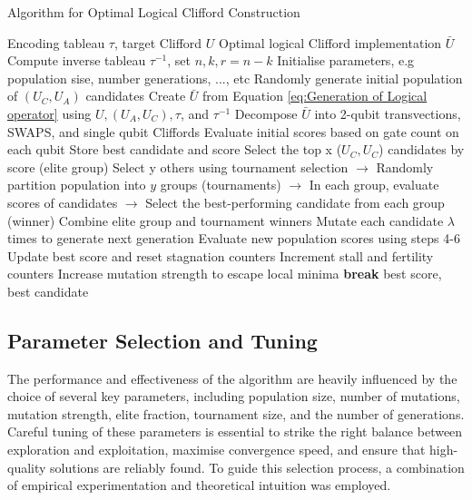 \begin{algorithm}[H]
\caption{Algorithm for Optimal Logical Clifford Construction}
\label{alg:logical_clifford_construction}
\begin{algorithmic}[1]
\Require Encoding tableau \(\tau\), target Clifford \(U\)
\Ensure Optimal logical Clifford implementation \(\bar{U}\)
\State Compute inverse tableau \(\tau^{-1}\), set \(n, k, r = n-k\)
\State Initialise parameters, e.g population sise, number generations, ..., etc
\Statex
\State Randomly generate initial population of \((U_C, U_A)\) candidates
\State Create \(\bar{U}\) from Equation \ref{eq:Generation of Logical operator} using \(U,(U_A,U_C),\tau\), and \(\tau^{-1}\)
\State Decompose \(\bar{U}\) into 2-qubit transvections, SWAPS, and single qubit Cliffords 
\State Evaluate initial scores based on gate count on each qubit 
\State Store best candidate and score
\Statex
{}
    \State Select the top x (\(U_C,U_C\)) candidates by score (elite group)
    \State Select y others using tournament selection
    \Statex \hspace{1.5em} \(\rightarrow \) Randomly partition population into \(y\) groups (tournaments)
    \Statex \hspace{1.5em} \(\rightarrow \) In each group, evaluate scores of candidates
    \Statex \hspace{1.5em} \(\rightarrow \) Select the best-performing candidate from each group (winner)
    \State Combine elite group and tournament winners
    \Statex
    \State Mutate each candidate \(\lambda\) times to generate next generation
    \Statex
    \State Evaluate new population scores using steps 4-6
    \Statex
        \State Update best score and reset stagnation counters
    \Else
        \State Increment stall and fertility counters
    \EndIf
        \State Increase mutation strength to escape local minima
    \EndIf
        \State \textbf{break}
    \EndIf
\EndFor
\State \Return best score, best candidate
\end{algorithmic}
\end{algorithm}

\subsection{Parameter Selection and Tuning}
The performance and effectiveness of the algorithm are heavily influenced by the choice of several key parameters, including population size, number of mutations, mutation strength, elite fraction, tournament size, and the number of generations. Careful tuning of these parameters is essential to strike the right balance between exploration and exploitation, maximise convergence speed, and ensure that high-quality solutions are reliably found. To guide this selection process, a combination of empirical experimentation and theoretical intuition was employed.

